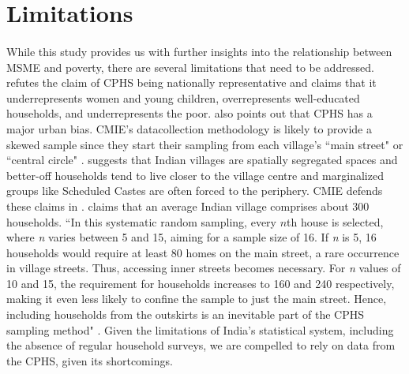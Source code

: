 \documentclass [12pt]{article}
\begin{document}
\section{Limitations}
\paragraph{}
While this study provides us with further insights into the relationship between MSME and poverty, there are several limitations that need to be addressed. \textcite{somanchi2021missing} refutes the claim of CPHS being nationally representative and claims that it underrepresents women and young children, overrepresents well-educated households, and underrepresents the poor. \textcite{somanchi2021missing} also points out that CPHS has a major urban bias. CMIE's datacollection methodology is likely to provide a skewed sample since they start their sampling from each village's ``main street" or ``central circle" \parencite{somanchi2021missing}. \textcite{somanchi2021missing} suggests that Indian villages are spatially segregated spaces and better-off households tend to live closer to the village centre and marginalized groups like Scheduled Castes are often forced to the periphery. 
CMIE defends these claims in \textcite{economictimes2021}. \textcite{economictimes2021} claims that an average Indian village comprises about 300 households. ``In this systematic random sampling, every $n$th house is selected, where \textit{n} varies between 5 and 15, aiming for a sample size of 16. If \textit{n} is 5, 16 households would require at least 80 homes on the main street, a rare occurrence in village streets. Thus, accessing inner streets becomes necessary. For \textit{n} values of 10 and 15, the requirement for households increases to 160 and 240 respectively, making it even less likely to confine the sample to just the main street. Hence, including households from the outskirts is an inevitable part of the CPHS sampling method" \parencite{economictimes2021}.
Given the limitations of India's statistical system, including the absence of regular household surveys, we are compelled to rely on data from the CPHS, given its shortcomings. 

\end{document}
